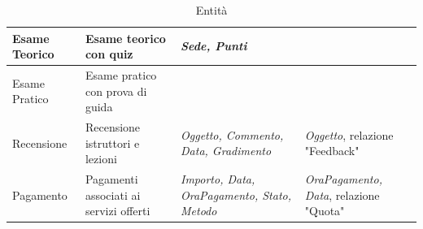 \documentclass[10pt,twoside]{article}
\begin{document}
{\begin{table}[H]
\begin{tabularx}{\textwidth}{|>{\centering\arraybackslash}p{2.6cm}|>{\centering\arraybackslash}X|>{\centering\arraybackslash}p{4.85cm}|>{\centering\arraybackslash}X|}
            \hline
            \rowcolor{white!40}
            Esame Teorico & Esame teorico con quiz & \textit{Sede, Punti} & \\
            \hline
            \rowcolor{white!40}
            Esame Pratico & Esame pratico con prova di guida & & \\
            \hline
            \rowcolor{white!40}
            Recensione & Recensione istruttori e lezioni & \textit{Oggetto, Commento, Data, Gradimento} & \textit{Oggetto}, relazione "Feedback"\\
            \hline
            \rowcolor{white!40}
            Pagamento & Pagamenti associati ai servizi offerti & \textit{Importo, Data, OraPagamento, Stato, Metodo} & \textit{OraPagamento, Data}, relazione "Quota"\\
            \hline
        \end{tabularx}
        \caption{Entità}
        \label{fig:tabellaEntita}
    \end{table}

}
\end{document}

